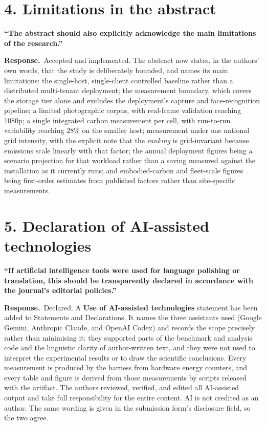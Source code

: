 \documentclass[11pt,a4paper]{article}
\newcommand{\point}[1]{\medskip\noindent\textbf{\color{black!75}#1}\par\smallskip}
\newcommand{\reply}{\noindent\textbf{Response.}\ }
\begin{document}
\section*{4. Limitations in the abstract}

\point{``The abstract should also explicitly acknowledge the main limitations of the research.''}

\reply Accepted and implemented. The abstract now states, in the authors' own words, that the study
is deliberately bounded, and names its main limitations: the single-host, single-client controlled
baseline rather than a distributed multi-tenant deployment; the measurement boundary, which covers
the storage tier alone and excludes the deployment's capture and face-recognition pipeline; a
limited photographic corpus, with real-frame validation reaching 1080p; a single integrated carbon
measurement per cell, with run-to-run variability reaching $28\%$ on the smaller host; measurement
under one national grid intensity, with the explicit note that the \emph{ranking} is grid-invariant
because emissions scale linearly with that factor; the annual deployment figures being a scenario
projection for that workload rather than a saving measured against the installation as it currently
runs; and embodied-carbon and fleet-scale figures being first-order estimates from published factors
rather than site-specific measurements.

\section*{5. Declaration of AI-assisted technologies}

\point{``If artificial intelligence tools were used for language polishing or translation, this
should be transparently declared in accordance with the journal's editorial policies.''}

\reply Declared. A \textbf{Use of AI-assisted technologies} statement has been added to Statements
and Declarations. It names the three assistants used (Google Gemini, Anthropic Claude, and OpenAI
Codex) and records the scope precisely rather than minimising it: they supported parts of the
benchmark and analysis code and the linguistic clarity of author-written text, and they were not
used to interpret the experimental results or to draw the scientific conclusions. Every measurement
is produced by the harness from hardware energy counters, and every table and figure is derived from
those measurements by scripts released with the artifact. The authors reviewed, verified, and edited
all AI-assisted output and take full responsibility for the entire content. AI is not credited as an
author. The same wording is given in the submission form's disclosure field, so the two agree.
\end{document}
